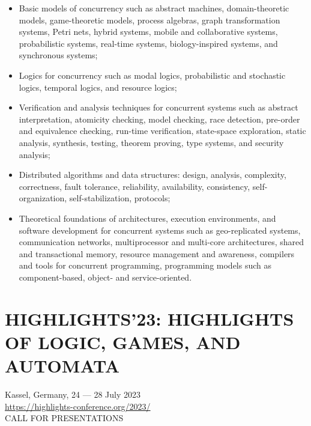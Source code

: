 \documentclass[prodmode,acmtecs]{acmsmall} %
\begin{document}
\begin{itemize}
\begin{itemize}\item  Basic models of concurrency such as abstract machines, domain-theoretic models, game-theoretic models, process algebras, graph transformation systems, Petri nets, hybrid systems, mobile and collaborative systems, probabilistic systems, real-time systems, biology-inspired systems, and synchronous systems;
\item  Logics for concurrency such as modal logics, probabilistic and stochastic logics, temporal logics, and resource logics;
\item  Verification and analysis techniques for concurrent systems such as abstract interpretation, atomicity checking, model checking, race detection, pre-order and equivalence checking, run-time verification, state-space exploration, static analysis, synthesis, testing, theorem proving, type systems, and security analysis; 
\item  Distributed algorithms and data structures: design, analysis, complexity, correctness, fault tolerance, reliability, availability, consistency, self-organization, self-stabilization, protocols;
\item  Theoretical foundations of architectures, execution environments, and software development for concurrent systems such as geo-replicated systems, communication networks, multiprocessor and multi-core architectures, shared and transactional memory, resource management and awareness, compilers and tools for concurrent programming, programming models such as component-based, object- and service-oriented.
\end{itemize} 
\end{itemize}\section{HIGHLIGHTS’23: HIGHLIGHTS OF LOGIC, GAMES, AND AUTOMATA}\label{HIGHLIGHTS23}  Kassel, Germany, 24 — 28 July 2023\\ 
  \href{https://highlights-conference.org/2023/}{https://highlights-conference.org/2023/}\\ 
CALL FOR PRESENTATIONS 
\end{document}
